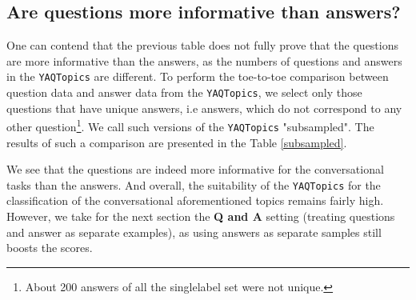 \subsection {Are questions more informative than answers?} 
One can contend that the previous table does not fully prove that the questions are more informative than the answers, as the numbers of questions and answers in the \texttt{YAQTopics} are different. To perform the toe-to-toe comparison between question data and answer data from the \texttt{YAQTopics}, we select only those questions that have unique answers, i.e answers, which do not correspond to any other question\footnote{About 200 answers of all the singlelabel set were not unique.}. We call such versions of the \texttt{YAQTopics} "subsampled". 
The results of such a comparison are presented in the Table \ref{subsampled}. 
\begin{table*}
\centering
\caption{Accuracy(f1) on the Russian \texttt{MASSIVE} for the subsampled versions of \texttt{YAQTopics}, with the one question corresponding to exactly one answer. Q means questions, and A means answers. Averaged by three runs. Backbone: \textit{bert-base-multilingual-cased}. Total score for majority baseline: accuracy 22.9, f1 6.2}
\end{table*}

We see that the questions are indeed more informative for the conversational tasks than the answers. And overall, the suitability of the \texttt{YAQTopics} for the classification of the conversational aforementioned topics remains fairly high. However, we take for the next section the \textbf{Q and A} setting (treating questions and answer as separate examples), as using answers as separate samples still boosts the scores. 

